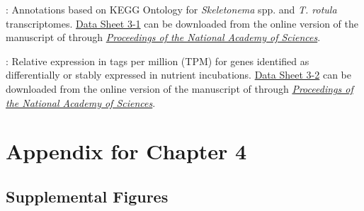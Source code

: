     \begin{DS3}
    
    \item \label{DS31}: Annotations based on KEGG Ontology for \textit{Skeletonema} spp. and \textit{T. rotula} transcriptomes. \href{http://www.pnas.org/content/suppl/2015/04/09/1421993112.DCSupplemental/pnas.1421993112.sd01.xlsx}{Data Sheet 3-1} can be downloaded from the online version of the manuscript of \citet{Alexander2015} through \href{http://www.pnas.org/content/112/17/E2182.full}{\textit{Proceedings of the National Academy of Sciences}}. 
    \item \label{DS32}: Relative expression in tags per million (TPM) for genes identified as differentially or stably expressed in nutrient incubations. \href{http://www.pnas.org/content/suppl/2015/04/09/1421993112.DCSupplemental/pnas.1421993112.sd02.xlsx}{Data Sheet 3-2} can be downloaded from the online version of the manuscript of \citet{Alexander2015} through \href{http://www.pnas.org/content/112/17/E2182.full}{\textit{Proceedings of the National Academy of Sciences}}. 
  
    \end{DS3}







\clearpage

\section{Appendix for Chapter 4}
\subsection{Supplemental Figures}

